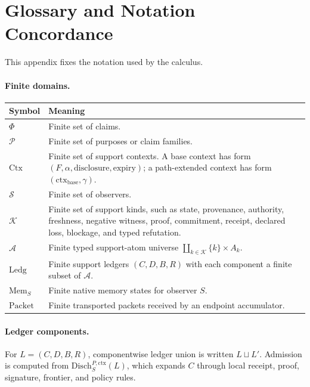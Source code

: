 \documentclass[11pt,twoside]{article}
\newcommand{\OGTableFont}{\small}
\newcommand{\OGTableHeaderRow}{\rowcolor{tableheaderbg}}
\newcommand{\TableHeaderRow}{\OGTableHeaderRow}
\newenvironment{OGInlineTable}[1]{%
  \par\smallskip
  \begin{center}
  #1
  \renewcommand{\arraystretch}{1.08}%
  \captionsetup{type=table,hypcap=false}%
  \rowcolors{2}{tablerowbg}{white}%
}{%
  \rowcolors{2}{}{}%
  \end{center}%
  \smallskip
}
\theoremstyle{definition}
\newcommand{\Disch}{\mathrm{Disch}}
\newcommand{\Atoms}{\mathcal{A}}
\newcommand{\Ledg}{\mathrm{Ledg}}
\newcommand{\Mem}{\mathrm{Mem}}
\newcommand{\Packet}{\mathrm{Packet}}
\newcommand{\ctx}{\mathrm{ctx}}
\begin{document}
\section{Glossary and Notation Concordance}
\label{app:glossary}

This appendix fixes the notation used by the calculus.

\paragraph{Finite domains.}
\begin{OGInlineTable}{\OGTableFont}
\begin{tabularx}{\textwidth}{>{\raggedright\arraybackslash}p{}>{\raggedright\arraybackslash}X}
\toprule
\TableHeaderRow \textbf{Symbol} & \textbf{Meaning} \\
\midrule
$\Phi$ & Finite set of claims. \\
$\mathcal P$ & Finite set of purposes or claim families. \\
$\mathrm{Ctx}$ & Finite set of support contexts. A base context has form $(F,\alpha,\mathrm{disclosure},\mathrm{expiry})$; a path-extended context has form $(\ctx_{\mathrm{base}},\gamma)$. \\
$\mathcal S$ & Finite set of observers. \\
$\mathcal K$ & Finite set of support kinds, such as state, provenance, authority, freshness, negative witness, proof, commitment, receipt, declared loss, blockage, and typed refutation. \\
$\Atoms$ & Finite typed support-atom universe $\coprod_{k\in\mathcal K}\{k\}\times A_k$. \\
$\Ledg$ & Finite support ledgers $(C,D,B,R)$ with each component a finite subset of $\Atoms$. \\
$\Mem_S$ & Finite native memory states for observer $S$. \\
$\Packet$ & Finite transported packets received by an endpoint accumulator. \\
\bottomrule
\end{tabularx}
\caption{Finite domains used by the support-obligation calculus.}
\label{tab:glossary-finite-domains}
\end{OGInlineTable}

\paragraph{Ledger components.}
For $L=(C,D,B,R)$, componentwise ledger union is written $L\sqcup L'$.
Admission is computed from $\Disch_S^{P,\ctx}(L)$, which expands $C$ through
local receipt, proof, signature, frontier, and policy rules.
\end{document}
